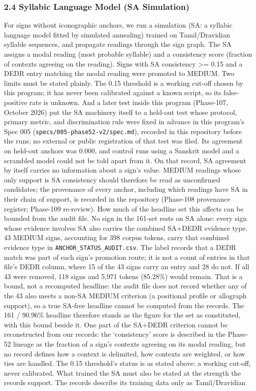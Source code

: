 \documentclass[
]{article}
\begin{document}
\subsubsection{2.4 Syllabic Language Model (SA
Simulation)}\label{syllabic-language-model-sa-simulation}

For signs without iconographic anchors, we run a simulation (SA: a syllabic language model fitted by simulated annealing) trained on Tamil/Dravidian syllable sequences, and propagate readings through the sign graph. The SA assigns a modal reading (most probable syllable) and a consistency score (fraction of contexts agreeing on the reading). Signs with SA consistency \textgreater{}= 0.15 and a DEDR entry matching the modal reading were promoted to MEDIUM. Two limits must be stated plainly. The 0.15 threshold is a working cut-off chosen by this program; it has never been calibrated against a known script, so its false-positive rate is unknown. And a later test inside this program (Phase-107, October 2026) put the SA machinery itself to a held-out test whose protocol, primary metric, and discrimination rule were fixed in advance in this program's Spec 005 (\texttt{specs/005-phase52-v2/spec.md}), recorded in this repository before the runs; no external or public registration of that test was filed. Its agreement on held-out anchors was 0.000, and control runs using a Sanskrit model and a scrambled model could not be told apart from it. On that record, SA agreement by itself carries no information about a sign's value. MEDIUM readings whose only support is SA consistency should therefore be read as unconfirmed candidates; the provenance of every anchor, including which readings have SA in their chain of support, is recorded in the repository (Phase-108 provenance register; Phase-109 re-review). How much of the headline set this affects can be bounded from the audit file. No sign in the 161-set rests on SA alone: every sign whose evidence involves SA also carries the combined SA+DEDR evidence type. 43 MEDIUM signs, accounting for 398 corpus tokens, carry that combined evidence type in \texttt{ANCHOR\_STATUS\_AUDIT.csv}. The label records that a DEDR match was part of each sign's promotion route; it is not a count of entries in that file's DEDR column, where 15 of the 43 signs carry an entry and 28 do not. If all 43 were removed, 118 signs and 5,971 tokens (85.28\%) would remain. That is a bound, not a recomputed headline: the audit file does not record whether any of the 43 also meets a non-SA MEDIUM criterion (a positional profile or allograph support), so a true SA-free headline cannot be computed from the records. The 161 / 90.96\% headline therefore stands as the figure for the set as constituted, with this bound beside it. One part of the SA+DEDR criterion cannot be reconstructed from our records: the `consistency' score is described in the Phase-52 lineage as the fraction of a sign's contexts agreeing on its modal reading, but no record defines how a context is delimited, how contexts are weighted, or how ties are handled. The 0.15 threshold's status is as stated above: a working cut-off, never calibrated. What trained the SA must also be stated at the strength the records support. The records describe its training data only as Tamil/Dravidian 
\end{document}
